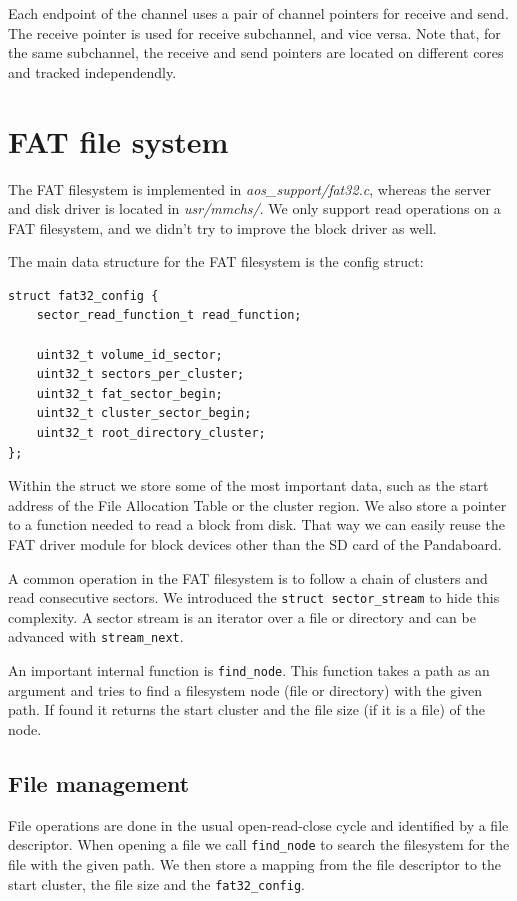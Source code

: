 \documentclass[a4paper,10pt]{article}
\newcommand{\filepath}[1]{\emph{ #1}}
\begin{document}
	Each endpoint of the channel uses a pair of channel pointers for receive and send. 
	The receive pointer is used for receive subchannel, and vice versa.
	Note that, for the same subchannel, the receive and send pointers are located on different cores and tracked independendly.
	


\section{FAT file system}

The FAT filesystem is implemented in \filepath{aos\_support/fat32.c}, whereas the server and disk driver is located in \filepath{usr/mmchs/}.
We only support read operations on a FAT filesystem, and we didn't try to improve the block driver as well.

The main data structure for the FAT filesystem is the config struct:

\begin{lstlisting}
struct fat32_config {
    sector_read_function_t read_function;

    uint32_t volume_id_sector;
    uint32_t sectors_per_cluster;
    uint32_t fat_sector_begin;
    uint32_t cluster_sector_begin;
    uint32_t root_directory_cluster;
};
\end{lstlisting}

Within the struct we store some of the most important data, such as the start address of the File Allocation Table or the cluster region.
We also store a pointer to a function needed to read a block from disk.
That way we can easily reuse the FAT driver module for block devices other than the SD card of the Pandaboard.

A common operation in the FAT filesystem is to follow a chain of clusters and read consecutive sectors.
We introduced the \lstinline!struct sector_stream! to hide this complexity.
A sector stream is an iterator over a file or directory and can be advanced with \lstinline!stream_next!.

An important internal function is \lstinline!find_node!.
This function takes a path as an argument and tries to find a filesystem node (file or directory) with the given path.
If found it returns the start cluster and the file size (if it is a file) of the node.

\subsection{File management}
File operations are done in the usual open-read-close cycle and identified by a file descriptor.
When opening a file we call \lstinline!find_node! to search the filesystem for the file with the given path.
We then store a mapping from the file descriptor to the start cluster, the file size and the \lstinline!fat32_config!.
\end{document}
